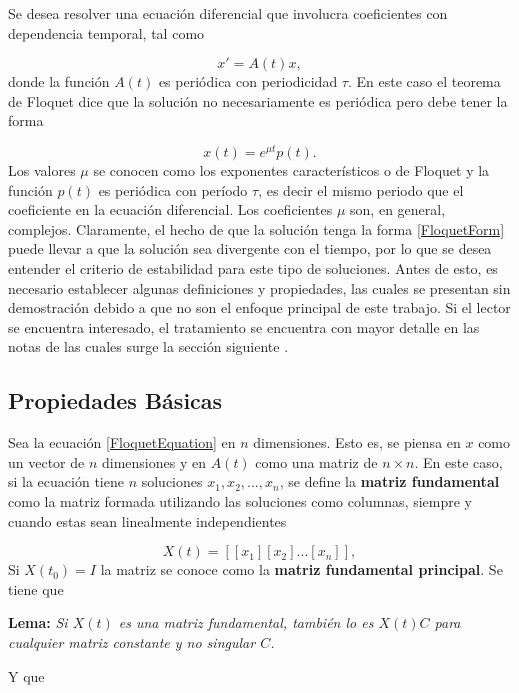 \documentclass[10pt,a4paper]{report}
\begin{document}
Se desea resolver una ecuación diferencial que involucra coeficientes con dependencia temporal, tal como

\begin{equation}\label{FloquetEquation}
x' = A(t)x,
\end{equation} donde la función $A(t)$ es periódica con periodicidad $\tau$. En este caso el teorema de Floquet\cite{WardFT} dice que la solución no necesariamente es periódica pero debe tener la forma

\begin{equation}\label{FloquetForm}
x(t)=e^{\mu t}p(t).
\end{equation} Los valores $\mu$ se conocen como los exponentes característicos o de Floquet y la función $p(t)$ es periódica con período $\tau$, es decir el mismo periodo que el coeficiente en la ecuación diferencial. Los coeficientes $\mu$ son, en general, complejos. Claramente, el hecho de que la solución tenga la forma \eqref{FloquetForm} puede llevar a que la solución sea divergente con el tiempo, por lo que se desea entender el criterio de estabilidad para este tipo de soluciones. Antes de esto, es necesario establecer algunas definiciones y propiedades, las cuales se presentan sin demostración debido a que no son el enfoque principal de este trabajo. Si el lector se encuentra interesado, el tratamiento se encuentra con mayor detalle en las notas de las cuales surge la sección siguiente \cite{WardFT}.

\subsection{Propiedades Básicas}

Sea la ecuación \eqref{FloquetEquation} en $n$ dimensiones. Esto es, se piensa en $x$ como un vector de $n$ dimensiones y en $A(t)$ como una matriz de $n \times n$. En este caso, si la ecuación tiene $n$ soluciones $x_1, x_2, ... , x_n$, se define la \textbf{matriz fundamental} como la matriz formada utilizando las soluciones como columnas, siempre y cuando estas sean linealmente independientes

\begin{equation}
X(t) = [[x_1][x_2]...[x_n]],
\end{equation}Si $X(t_0) = I$ la matriz se conoce como la \textbf{matriz fundamental principal}. Se tiene que

\begin{center}
\textbf{Lema:} \textit{Si $X(t)$ es una matriz fundamental, también lo es $X(t)C$ para cualquier matriz constante y no singular $C$.}
\end{center}Y que
\end{document}
